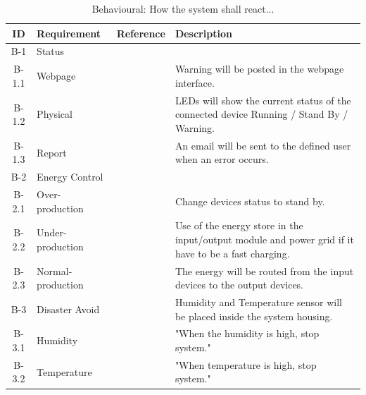 		\begin{table}[h!]
			\begin{tabular} [b] {| c |  p{3cm} | c | p{10cm} |}
			\hline
			\textbf{ID} & \textbf{Requirement} & \textbf{Reference} & \textbf{Description} \\\hline
			B-1 & Status &  &  \\\hline
			B-1.1 & Webpage &  & Warning will be posted in the webpage interface. \\\hline
			B-1.2 & Physical &  & LEDs will show the current status of the connected device Running / Stand By / Warning. \\\hline
			B-1.3 & Report &  & An email will be sent to the defined user when an error occurs. \\\hline
			B-2 & Energy Control &  &  \\\hline
			B-2.1 & Over-production &  & Change devices status to stand by. \\\hline
			B-2.2 & Under-production &  & Use of the energy store in the input/output module and power grid if it have to be a fast charging. \\\hline
			B-2.3 & Normal-production &  & The energy will be routed from the input devices to the output devices. \\\hline
			B-3 & Disaster Avoid &  & Humidity and Temperature sensor will be placed inside the system housing. \\\hline
			B-3.1 & Humidity &  & "When the humidity is high, stop system." \\\hline
			B-3.2 & Temperature &  & "When temperature is high,  stop system." \\\hline
		\end{tabular}
		\caption{Behavioural: How the system shall react...}
		\end{table}
		
